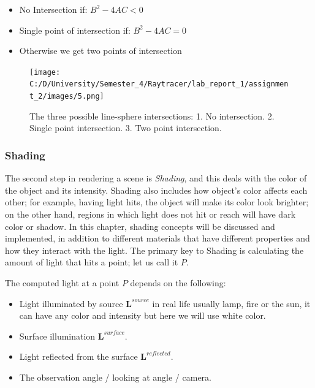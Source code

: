 \documentclass[11pt,a4paper]{article}
\begin{document}
	\begin{itemize}
		\item No Intersection if: \( B^2 - 4AC < 0 \) 
		\item Single point of intersection if: \( B^2 - 4AC = 0 \)
		\item Otherwise we get two points of intersection
	\end{itemize}
	
	
	\begin{figure}[H]
		\begin{center}
			\texttt{[image: C:/D/University/Semester\_4/Raytracer/lab\_report\_1/assignment\_2/images/5.png]}
			
			\caption{The three possible line-sphere intersections:
				1. No intersection.
				2. Single point intersection.
				3. Two point intersection.}
			\label{fig:2}
		\end{center}
	\end{figure}
	
	\subsubsection*{Shading}
	The second step in rendering a scene is \textit{Shading}, and this deals with the color of the object and its intensity. Shading also includes how object's color affects each other; for example, having light hits, the object will make its color look brighter; on the other hand, regions in which light does not hit or reach will have dark color or shadow. In this chapter, shading concepts will be discussed and implemented, in addition to different materials that have different properties and how they interact with the light. The primary key to Shading is calculating the amount of light that hits a point; let us call it $ P $. 
	
	The computed light at a point $ P $ depends on the following: 
	
	\begin{itemize}
		\item Light illuminated by source  $\pmb{L}^{source}$  in real life usually lamp, fire or the sun, it can have any color and intensity but here we will use white color. 
		\item Surface illumination $\pmb{L}^{surface}$.
		\item Light reflected from the surface $\pmb{L}^{reflected}$.
		\item The observation angle / looking at angle / camera. 
	\end{itemize}
	
\end{document}
